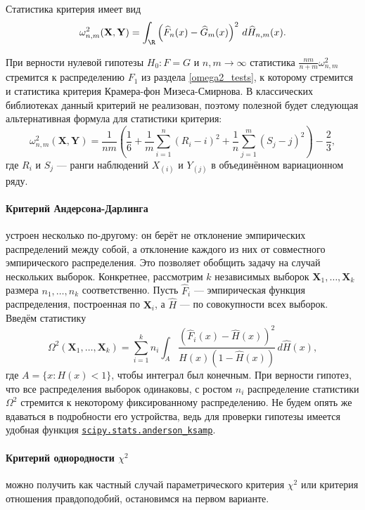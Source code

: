 Статистика критерия имеет вид
\[
\omega^2_{n,m}(\mathbf X, \mathbf Y) = \int_{\R} \left(\widehat{F}_n(x) - \widehat{G}_m(x)\right)^2\,d\widehat{H}_{n,m}(x).
\]

При верности нулевой гипотезы $H_0\colon F = G$ и $n, m \to \infty$ статистика $\frac{nm}{n+m}\omega^2_{n,m}$ стремится к распределению $F_1$ из раздела \ref{omega2_tests}, к которому стремится и статистика критерия Крамера-фон Мизеса-Смирнова. В классических библиотеках данный критерий не реализован, поэтому полезной будет следующая альтернативная формула для статистики критерия:
\begin{equation}\label{alternative_formula_for_rosenblatt}
	\omega^2_{n,m}(\mathbf X, \mathbf Y) = \frac{1}{nm}\left(\frac{1}{6} + \frac{1}{m}\sum_{i=1}^n (R_i - i)^2 + \frac{1}{n}\sum_{j=1}^m (S_j - j)^2\right) - \frac{2}{3},
\end{equation}
где $R_i$ и $S_j$ --- ранги наблюдений $X_{(i)}$ и $Y_{(j)}$ в объединённом вариационном ряду.

\paragraph{Критерий Андерсона-Дарлинга} устроен несколько по-другому: он берёт не отклонение эмпирических распределений между собой, а отклонение каждого из них от совместного эмпирического распределения. Это позволяет обобщить задачу на случай нескольких выборок. Конкретнее, рассмотрим $k$ независимых выборок $\mathbf X_1, \ldots, \mathbf X_k$ размера $n_1, \ldots, n_k$ соответственно. Пусть $\widehat F_{i}$ --- эмпирическая функция распределения, построенная по $\mathbf X_i$, а $\widehat H$ --- по совокупности всех выборок. Введём статистику
\[
\Omega^2(\mathbf X_1, \ldots, \mathbf X_k) = \sum_{i=1}^k n_i \int_{A} \frac{(\widehat F_i(x) - \widehat H(x))^2}{\widehat H(x)(1-\widehat H(x))} \, d\widehat H(x),
\]
где $A = \{x\colon H(x) < 1\}$, чтобы интеграл был конечным. При верности гипотез, что все распределения выборок одинаковы, с ростом $n_i$ распределение статистики $\Omega^2$ стремится к некоторому фиксированному распределению. Не будем опять же вдаваться в подробности его устройства, ведь для проверки гипотезы имеется удобная функция \href{https://docs.scipy.org/doc/scipy/reference/generated/scipy.stats.anderson\_ksamp.html}{\texttt{scipy.stats.anderson\_ksamp}}.

\paragraph{Критерий однородности $\chi^2$} можно получить как частный случай параметрического критерия $\chi^2$ или критерия отношения правдоподобий, остановимся на первом варианте.

